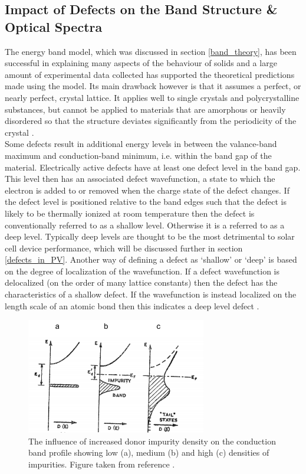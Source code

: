 \subsection{Impact of Defects on the Band Structure \& Optical Spectra}\label{PL_section}
The energy band model, which was discussed in section \ref{band_theory}, has been successful in explaining many aspects of the behaviour of solids and a large amount of experimental data collected has supported the theoretical predictions made using the model. Its main drawback however is that it assumes a perfect, or nearly perfect, crystal lattice. It applies well to single crystals and polycrystalline substances, but cannot be applied to materials that are amorphous or heavily disordered so that the structure deviates significantly from the periodicity of the crystal \cite{small_semiconductor1}. \\

Some defects result in additional energy levels in between the valance-band maximum and conduction-band minimum, i.e. within the band gap of the material. Electrically active defects have at least one defect level in the band gap. This level then has an associated defect wavefunction, a state to which the electron is added to or removed when the charge state of the defect changes. If the defect level is positioned relative to the band edges such that the defect is likely to be thermally ionized at room temperature then the defect is conventionally referred to as a shallow level. Otherwise it is a referred to as a deep level. Typically deep levels are thought to be the most detrimental to solar cell device performance, which will be discussed further in section \ref{defects_in_PV}. Another way of defining a defect as `shallow' or `deep' is based on the degree of localization of the wavefunction. If a defect wavefunction is delocalized (on the order of many lattice constants) then the defect has the characteristics of a shallow defect. If the wavefunction is instead localized on the length scale of an atomic bond then this indicates a deep level defect \cite{defects_tutorial}.\\

\begin{figure}[h!]
  \centering
    \includegraphics[width=0.7\textwidth]{figures/bs2.png}
    \caption{The influence of increased donor impurity density on the conduction band profile showing low (a), medium (b) and high (c) densities of impurities. Figure taken from reference .}
  \label{bs2}
\end{figure}


